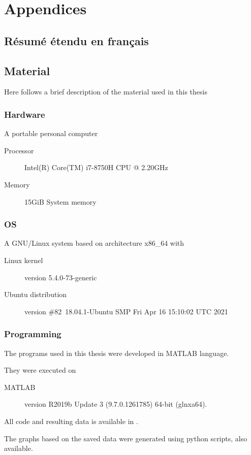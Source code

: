 \documentclass[../main.tex]{subfiles}
\begin{document}
\part{Appendices}
\chapter{Résumé étendu en français}

\minitoc

\chapter{Material}
Here follows a brief description of the material used in this thesis
\section{Hardware}
A portable personal computer
\begin{description}
\item [Processor] Intel(R) Core(TM) i7-8750H CPU @ 2.20GHz
\item [Memory] 15GiB System memory
\end{description}
\section{OS}
A GNU/Linux system based on architecture x86\_64 with
\begin{description}
    \item[Linux kernel] version 5.4.0-73-generic
    \item[Ubuntu distribution] version \#82~18.04.1-Ubuntu SMP Fri Apr 16 15:10:02 UTC 2021
\end{description}

\section{Programming}
The programs used in this thesis were developed in MATLAB language.

They were executed on
\begin{description}
\item[MATLAB] version R2019b Update 3 (9.7.0.1261785) 64-bit (glnxa64).
\end{description}

All code and resulting data is available in .

The graphs based on the saved data were generated using python scripts, also available.
\end{document}
